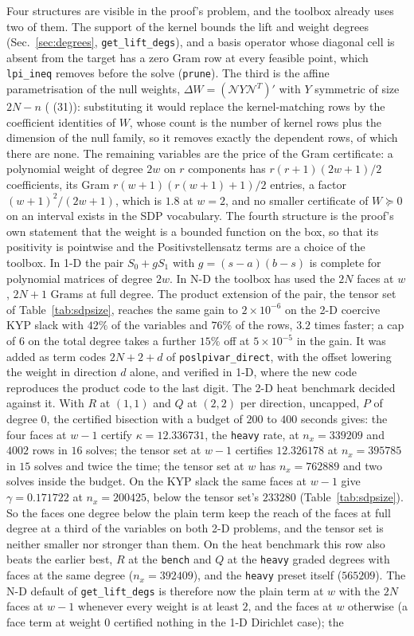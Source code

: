 \documentclass[12pt]{article}
\newcommand{\mcl}[1]{\mathcal{#1}}
\newcommand{\code}[1]{\texttt{#1}}
\newcommand{\file}[1]{\path{#1}}      %
\theoremstyle{plain}
\theoremstyle{definition}
\theoremstyle{remark}
\begin{document}
Four structures are visible in the proof's problem, and the toolbox already uses two of them. The support of the kernel bounds the lift and weight degrees (Sec.~\ref{sec:degrees}, \code{get\_lift\_degs}), and a basis operator whose diagonal cell is absent from the target has a zero Gram row at every feasible point, which \code{lpi\_ineq} removes before the solve (\code{prune}). The third is the affine parametrisation of the null weights, $\Delta W=(\mcl N Y\mcl N^T)'$ with $Y$ symmetric of size $2N-n$ (\file{canonical\_measure\_storage.md} (31)): substituting it would replace the kernel-matching rows by the coefficient identities of $W$, whose count is the number of kernel rows plus the dimension of the null family, so it removes exactly the dependent rows, of which there are none. The remaining variables are the price of the Gram certificate: a polynomial weight of degree $2w$ on $r$ components has $r(r+1)(2w+1)/2$ coefficients, its Gram $r(w+1)(r(w+1)+1)/2$ entries, a factor $(w+1)^2/(2w+1)$, which is $1.8$ at $w=2$, and no smaller certificate of $W\succeq0$ on an interval exists in the SDP vocabulary. The fourth structure is the proof's own statement that the weight is a bounded function on the box, so that its positivity is pointwise and the Positivstellensatz terms are a choice of the toolbox. In 1-D the pair $S_0+gS_1$ with $g=(s-a)(b-s)$ is complete for polynomial matrices of degree $2w$. In N-D the toolbox has used the $2N$ faces at $w$, $2N+1$ Grams at full degree. The product extension of the pair, the tensor set of Table~\ref{tab:sdpsize}, reaches the same gain to $2\times10^{-6}$ on the 2-D coercive KYP slack with $42\%$ of the variables and $76\%$ of the rows, $3.2$ times faster; a cap of $6$ on the total degree takes a further $15\%$ off at $5\times10^{-5}$ in the gain. It was added as term codes $2N+2+d$ of \code{poslpivar\_direct}, with the offset lowering the weight in direction $d$ alone, and verified in 1-D, where the new code reproduces the product code to the last digit. The 2-D heat benchmark decided against it. With $R$ at $(1,1)$ and $Q$ at $(2,2)$ per direction, uncapped, $P$ of degree $0$, the certified bisection with a budget of $200$ to $400$ seconds gives: the four faces at $w-1$ certify $\kappa=12.336731$, the \code{heavy} rate, at $n_x=339209$ and $4002$ rows in $16$ solves; the tensor set at $w-1$ certifies $12.326178$ at $n_x=395785$ in $15$ solves and twice the time; the tensor set at $w$ has $n_x=762889$ and two solves inside the budget. On the KYP slack the same faces at $w-1$ give $\gamma=0.171722$ at $n_x=200425$, below the tensor set's $233280$ (Table~\ref{tab:sdpsize}). So the faces one degree below the plain term keep the reach of the faces at full degree at a third of the variables on both 2-D problems, and the tensor set is neither smaller nor stronger than them. On the heat benchmark this row also beats the earlier best, $R$ at the \code{bench} and $Q$ at the \code{heavy} graded degrees with faces at the same degree ($n_x=392409$), and the \code{heavy} preset itself ($565209$). The N-D default of \code{get\_lift\_degs} is therefore now the plain term at $w$ with the $2N$ faces at $w-1$ whenever every weight is at least $2$, and the faces at $w$ otherwise (a face term at weight $0$ certified nothing in the 1-D Dirichlet case); the 
\end{document}
